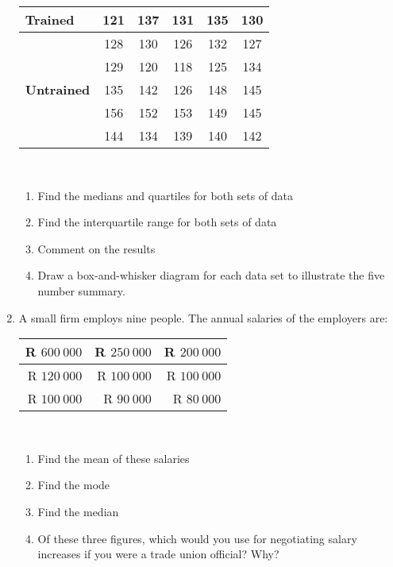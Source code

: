 \begin{eocexercises}{}
\begin{enumerate}[itemsep=6pt, label=\textbf{\arabic*}.]
\begin{center}
\begin{tabular}{|l|c|c|c|c|c|}
        \textbf{Trained} & 121 & 137 & 131 & 135 & 130 \\ \hline
                         & 128 & 130 & 126 & 132 & 127 \\\hline
                         & 129 & 120 & 118 & 125 & 134 \\\hline

        \textbf{Untrained} & 135 & 142 & 126 & 148 & 145 \\\hline
                           & 156 & 152 & 153 & 149 & 145 \\\hline
                           & 144 & 134 & 139 & 140 & 142 \\\hline

      \end{tabular}
    \end{center}
\vspace {8pt}\\
    \begin{enumerate}[noitemsep, label=\textbf{(\alph*)} ]
    \item Find the medians and quartiles for both sets of data
    \item Find the interquartile range for both sets of data
    \item Comment on the results
\item Draw a box-and-whisker diagram for each data set to illustrate the five number summary.
    \end{enumerate}

  \item A small firm employs nine people. The annual salaries of the employers are:
\\
    \begin{center}
      \begin{tabular}{|r|r|r|} \hline
      
        R $600~ 000$ & R $250~ 000$ & R $200~ 000$ \\\hline
        R $120 ~000 $& R $100~ 000$ & R $100 ~000$ \\\hline
        R $100 ~000$ & R  $90~ 000$ & R  $80 ~000$ \\\hline
   
      \end{tabular}
    \end{center}
\vspace {8pt}\\
    \begin{enumerate}[noitemsep, label=\textbf{(\alph*)} ]
    \item Find the mean of these salaries
    \item Find the mode
    \item Find the median
    \item Of these three figures, which would you use for
      negotiating salary increases if you were a trade union
      official? Why?
    \end{enumerate}


\end{enumerate}
\end{eocexercises}
